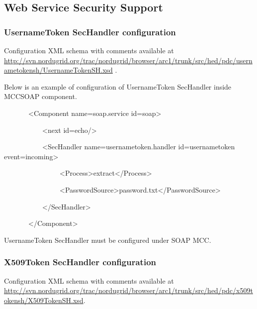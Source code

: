 \documentclass{article}
\newcommand\textstyleInternetlink[1]{\textcolor[rgb]{0.0,0.0,0.5019608}{#1}}
\begin{document}
\subsection[Web Service Security Support]{\color{black} Web Service
Security Support}
\subsubsection[UsernameToken SecHandler configuration]{UsernameToken
SecHandler configuration}
{\upshape\color{black}
Configuration XML schema with comments available at
\url{http://svn.nordugrid.org/trac/nordugrid/browser/arc1/trunk/src/hed/pdc/usernametokensh/UsernameTokenSH.xsd}
.}

{\upshape\color{black}
Below is an example of configuration of UsernameToken SecHandler inside
MCCSOAP component.}

{\ttfamily\color{black}
\ \ \ \ \ \ \ {\textless}Component
name={\textquotedbl}soap.service{\textquotedbl}
id={\textquotedbl}soap{\textquotedbl}{\textgreater}}

{\ttfamily\color{black}
\ \ \ \ \ \ \ \ \ \ \ {\textless}next
id={\textquotedbl}echo{\textquotedbl}/{\textgreater}}

{\ttfamily\color{black}
\ \ \ \ \ \ \ \ \ \ \ {\textless}SecHandler
name={\textquotedbl}usernametoken.handler{\textquotedbl}
id={\textquotedbl}usernametoken{\textquotedbl}
event={\textquotedbl}incoming{\textquotedbl}{\textgreater}}

{\ttfamily\color{black}
\ \ \ \ \ \ \ \ \ \ \ \ \ \ \ \ {\textless}Process{\textgreater}extract{\textless}/Process{\textgreater}}

{\ttfamily\color{black}
\ \ \ \ \ \ \ \ \ \ \ \ \ \ \ \ {\textless}PasswordSource{\textgreater}password.txt{\textless}/PasswordSource{\textgreater}}

{\ttfamily\color{black}
\ \ \ \ \ \ \ \ \ \ \ {\textless}/SecHandler{\textgreater}}

{\ttfamily\color{black}
\ \ \ \ \ \ \ {\textless}/Component{\textgreater}}

{\color{black}
UsernameToken SecHandler must be configured under SOAP MCC.}

\subsubsection[X509Token SecHandler configuration]{X509Token SecHandler
configuration}
{\upshape\color{black}
Configuration XML schema with comments available at
\href{http://svn.nordugrid.org/trac/nordugrid/browser/arc1/trunk/src/hed/pdc/usernametokensh/UsernameTokenSH.xsd}{\textstyleInternetlink{http://svn.nordugrid.org/trac/nordugrid/browser/arc1/trunk/src/hed/pdc/x509tokensh/X509TokenSH.xs}}\href{http://svn.nordugrid.org/trac/nordugrid/browser/arc1/trunk/src/hed/pdc/usernametokensh/UsernameTokenSH.xsd}{\textstyleInternetlink{d}}.}
\end{document}
